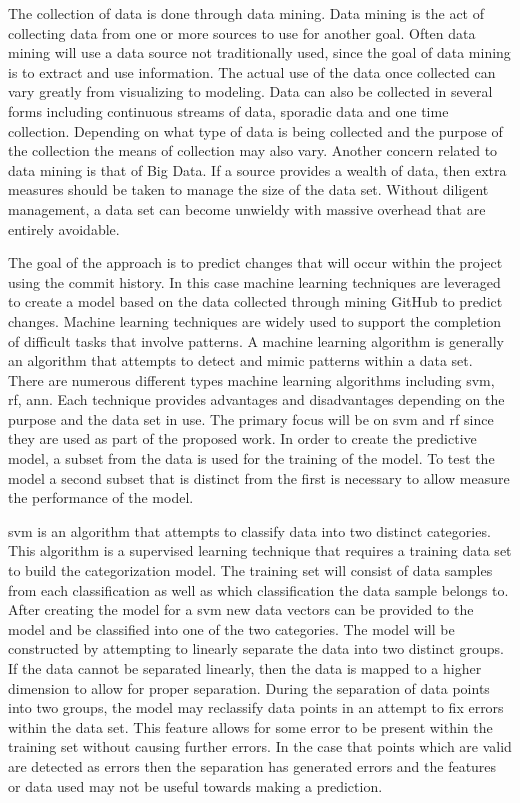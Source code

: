 The collection of data is done through data mining. Data mining is the act of collecting data from one or more sources to use for another goal. Often data mining will use a data source not traditionally used, since the goal of data mining is to extract and use information. The actual use of the data once collected can vary greatly from visualizing to modeling. Data can also be collected in several forms including continuous streams of data, sporadic data and one time collection. Depending on what type of data is being collected and the purpose of the collection the means of collection may also vary. Another concern related to data mining is that of Big Data. If a source provides a wealth of data, then extra measures should be taken to manage the size of the data set. Without diligent management, a data set can become unwieldy with massive overhead that are entirely avoidable.

The goal of the approach is to predict changes that will occur within the project using the commit history. In this case machine learning techniques are leveraged to create a model based on the data collected through mining GitHub to predict changes. Machine learning techniques are widely used to support the completion of difficult tasks that involve patterns. A machine learning algorithm is generally an algorithm that attempts to detect and mimic patterns within a data set. There are numerous different types machine learning algorithms including \gls{svm}, \gls{rf}, \gls{ann}. Each technique provides advantages and disadvantages depending on the purpose and the data set in use. The primary focus will be on \gls{svm} and \gls{rf} since they are used as part of the proposed work. In order to create the predictive model, a subset from the data is used for the training of the model. To test the model a second subset that is distinct from the first is necessary to allow measure the performance of the model.

\gls{svm} is an algorithm that attempts to classify data into two distinct categories. This algorithm is a supervised learning technique that requires a training data set to build the categorization model. The training set will consist of data samples from each classification as well as which classification the data sample belongs to. After creating the model for a \gls{svm} new data vectors can be provided to the model and be classified into one of the two categories. The model will be constructed by attempting to linearly separate the data into two distinct groups. If the data cannot be separated linearly, then the data is mapped to a higher dimension to allow for proper separation. During the separation of data points into two groups, the model may reclassify data points in an attempt to fix errors within the data set. This feature allows for some error to be present within the training set without causing further errors. In the case that points which are valid are detected as errors then the separation has generated errors and the features or data used may not be useful towards making a prediction.%

